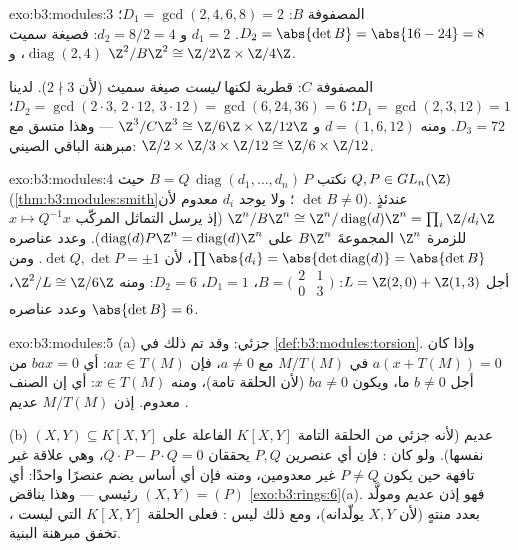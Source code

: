 \begin{solution}{exo:b3:modules:3}
المصفوفة $B$: $D_1 = \gcd(2,4,6,8) = 2$؛ $D_2 = \abs{\det B} = \abs{16 -
24} = 8$.  $d_1 = 2$
و $d_2 = 8/2 = 4$: فصيغة سميث $\operatorname{diag}(2, 4)$، و $\Z^2/B\Z^2 \cong \Z/2\Z
\times \Z/4\Z$.

المصفوفة $C$: قطرية لكنها \emph{ليست} صيغة سميث (لأن
$2 \nmid 3$). لدينا $D_1 =
\gcd(2,3,12) = 1$؛ $D_2 = \gcd(2\cdot3,\, 2\cdot12,\, 3\cdot12) =
\gcd(6, 24, 36) = 6$؛ $D_3 = 72$. ومنه
$d = (1, 6, 12)$ و $\Z^3/C\Z^3 \cong \Z/6\Z\times\Z/12\Z$ --- وهذا متسق مع مبرهنة الباقي
الصيني: $\Z/2\times\Z/3\times\Z/12 \cong \Z/6\times\Z/12$.
\end{solution}

\begin{solution}{exo:b3:modules:4}
نكتب $B = Q\,\operatorname{diag}(d_1, \dots, d_n)\,P$ حيث $Q, P
\in GL_n(\Z)$ (\cref{thm:b3:modules:smith}؛ ولا يوجد $d_i$ معدوم لأن
$\det B \neq 0$). عندئذٍ $\Z^n/B\Z^n \cong \Z^n/
\operatorname{diag}(d)\Z^n = \prod_i \Z/d_i\Z$ (إذ يرسل التماثل المركّب $x \mapsto Q^{-1}x$
للزمرة $\Z^n$ المجموعةَ $B\Z^n$ على $\operatorname{diag}(d)P\Z^n = \operatorname{diag}(d)\Z^n$). وعدد عناصره $\prod \abs{d_i} = \abs{\det
\operatorname{diag}(d)} = \abs{\det B}$،
لأن $\det Q, \det P = \pm
1$. ومن أجل $L = \Z(2,0) + \Z(1,3)$: $B = \bigl(\begin{smallmatrix}2
& 1\\ 0 & 3\end{smallmatrix}\bigr)$، $D_1 = 1$، $D_2 = 6$: ومنه
$\Z^2/L
\cong \Z/6\Z$، وعدد عناصره $\abs{\det B} = 6$.
\end{solution}

\begin{solution}{exo:b3:modules:5}
(a)  جزئي: وقد تم ذلك في \cref{def:b3:modules:torsion}. وإذا كان $a(x +
T(M)) = 0$ في
$M/T(M)$ مع $a \neq 0$، فإن $ax \in T(M)$: أي $bax
= 0$ من أجل
$b \neq 0$ ما، ويكون $ba \neq 0$ (لأن الحلقة تامة)، ومنه $x \in
T(M)$:
أي إن الصنف معدوم. إذن $M/T(M)$ عديم .

(b)  $(X, Y) \subseteq K[X,Y]$ عديم  (لأنه  جزئي من الحلقة
التامة $K[X,Y]$ الفاعلة على نفسها). ولو كان : فإن أي
عنصرين $P, Q$ يحققان $Q\cdot P - P \cdot Q = 0$، وهي علاقة غير تافهة حين يكون
$P \ne Q$ غير معدومين، ومنه فإن أي أساس يضم عنصرًا واحدًا:
أي $(X, Y) = (P)$ رئيسي --- وهذا يناقض \cref{exo:b3:rings:6}(a). فهو إذن
عديم  ومولَّد بعدد منتهٍ (لأن $X, Y$ يولّدانه)، ومع ذلك
ليس : فعلى الحلقة $K[X,Y]$ التي ليست ،
تخفق مبرهنة البنية.
\end{solution}

